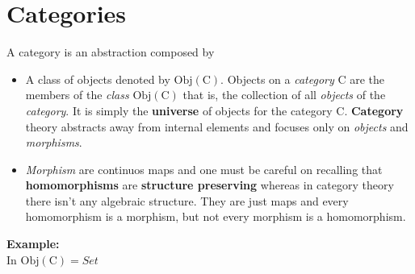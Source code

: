 \documentclass[10pt]{article}
\begin{document}
\section*{Categories}

A category is an abstraction composed by 
\begin{itemize}
	\item A class of objects denoted by $\text{Obj}(\mathrm{C})$. Objects on a \textit{category} $\mathrm{C}$ are the members of the \textit{class} $\text{Obj}(\mathrm{C})$ that is, the collection of all \textit{objects} of the \textit{category}. It is simply the \textbf{universe} of objects for the category $\mathrm{C}$. \textbf{Category} theory abstracts away from internal elements and focuses only on \textit{objects} and \textit{morphisms}.
	
	\item \textit{Morphism} are continuos maps and one must be careful on recalling that \textbf{homomorphisms} are \textbf{structure preserving} whereas in category theory there isn't any algebraic structure. They are just maps and every homomorphism is a morphism, but not every morphism is a homomorphism.
\end{itemize}	
\textbf{Example:}\\
\vspace{0.5cm}
In $\text{Obj}(\mathrm{C})=Set$
\end{document}
